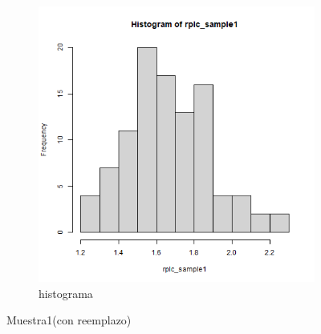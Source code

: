 \documentclass[a4paper,12pt]{article}
\begin{document}
\begin{enumerate}
\begin{figure}[t!]
\begin{subfigure}[b]{0.4\linewidth}
        \includegraphics[width = \linewidth]{./datos generados (Ejercicio 1)/replacement_sample1_hist.png}
        \caption{histograma}
    \end{subfigure}

    
    \caption{Muestra1(con reemplazo)}
    \label{figure}
\end{figure}


\end{enumerate}
\end{document}
